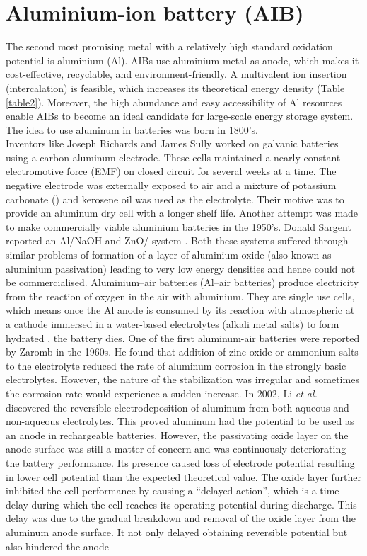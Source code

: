 \section{Aluminium-ion battery (AIB)}
The second most promising metal with a relatively high standard oxidation potential is aluminium (Al). AIBs use aluminium metal as anode, which makes it cost-effective, recyclable, and environment-friendly. A multivalent ion insertion (intercalation) is feasible, which increases its theoretical energy density (Table \ref{table2}). Moreover, the high abundance and easy accessibility of Al resources enable AIBs to become an ideal candidate for large-scale energy storage system. 
The idea to use aluminum in batteries was born in 1800's.\\ Inventors like Joseph Richards and James Sully worked on galvanic batteries using a carbon-aluminum electrode\cite{richards_aluminum_1887, sully_james_1897}. These cells maintained a nearly constant electromotive force (EMF) on closed circuit for several weeks at a time. The negative electrode was externally exposed to air and a mixture of potassium carbonate () and kerosene oil was used as the electrolyte. Their motive was to provide an aluminum dry cell with a longer shelf life. Another attempt was made to make commercially viable aluminium batteries in the 1950's. Donald Sargent reported an Al/NaOH and ZnO/ system \cite{sargent_voltaic_1951-1}. Both these systems suffered through similar problems of formation of a layer of aluminium oxide (also known as aluminium passivation) leading to very low energy densities and hence could not be commercialised. Aluminium–air batteries (Al–air batteries) produce electricity from the reaction of oxygen in the air with aluminium. They are single use cells, which means once the Al anode is consumed by its reaction with atmospheric  at a cathode immersed in a water-based electrolytes (alkali metal salts) to form hydrated , the battery dies. One of the first aluminum-air batteries were reported by Zaromb\cite{zaromb_use_1962} in the 1960s. He found that addition of zinc oxide or ammonium salts to the electrolyte reduced the rate of aluminum corrosion in the strongly basic electrolytes. However, the nature of the stabilization was irregular and sometimes the corrosion rate would experience a sudden increase\cite{bockstie_control_1963}. In 2002, Li \textit{et al.} discovered the reversible electrodeposition of aluminum from both aqueous and non-aqueous electrolytes\cite{li_aluminum_2002}. This proved aluminum had the potential to be used as an anode in rechargeable batteries. However, the passivating oxide layer on the anode surface was still a matter of concern and was continuously deteriorating the battery performance. Its presence caused loss of electrode potential resulting in lower cell potential than the expected theoretical value. The oxide layer further inhibited the cell performance by causing a \enquote{delayed action}, which is a time delay during which the cell reaches its operating potential during discharge. This delay was due to the gradual breakdown and removal of the oxide layer from the aluminum anode surface. It not only delayed obtaining reversible potential but also hindered the anode 